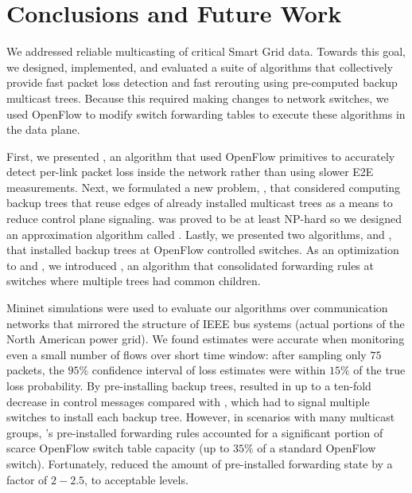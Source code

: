 \section{Conclusions and Future Work}
\label{sec:conclude}

We addressed reliable multicasting of critical Smart Grid data.
Towards this goal, we designed, implemented, and evaluated a suite of algorithms that collectively provide fast packet loss detection and fast rerouting using pre-computed backup multicast trees. 
Because this required making changes to network switches, we used OpenFlow to modify switch forwarding tables to execute these algorithms in the data plane.

First, we presented \pcnts, an algorithm that used OpenFlow primitives to accurately detect per-link packet loss inside the network rather than using slower E2E measurements. %
Next, we formulated a new problem, \mcs, that considered computing
backup trees that reuse edges of already installed multicast trees as a means to reduce control plane signaling.  \mc was proved to be at least NP-hard
so we designed an approximation algorithm called \steiners.  Lastly, we presented two algorithms, \pre and \posts, that installed backup trees at OpenFlow controlled switches. 
As an optimization to \pre and \posts, 
we introduced \merges, an algorithm that consolidated forwarding rules at switches where multiple trees had common children.


Mininet simulations were used to evaluate our algorithms over communication networks that mirrored the structure of IEEE bus systems (actual portions of the North American power grid).
We found \pcnt estimates were accurate when monitoring even a small number of flows over short time window: after sampling only $75$ packets, the $95\%$ confidence interval of \pcnt loss estimates 
were within $15\%$ of the true loss probability. By pre-installing 
backup trees, \pre resulted in up to a ten-fold decrease in control messages compared with \posts, which had to signal multiple switches to install each backup tree. 
However, in scenarios with many multicast groups, \pres's pre-installed forwarding rules accounted for a significant portion of scarce OpenFlow switch table capacity (up to $35\%$ of
a standard OpenFlow switch). Fortunately, \merge reduced the amount of pre-installed forwarding state by a factor of $2-2.5$, to acceptable levels.


